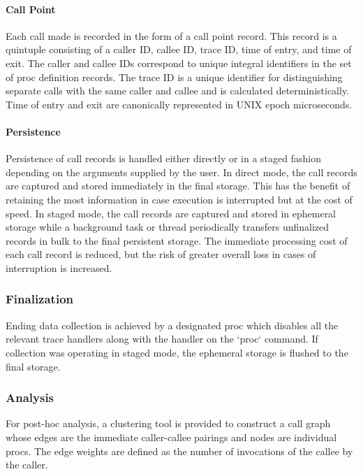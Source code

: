 \documentclass{article}[letter,10pt]
\begin{document}
{{    \paragraph{Call Point}{
      Each call made is recorded in the form of a call point record. This record
      is a quintuple consisting of a caller ID, callee ID, trace ID, time of
      entry, and time of exit. The caller and callee IDs correspond to unique
      integral identifiers in the set of proc definition records. The trace ID is a
      unique identifier for distinguishing separate calls with the same caller
      and callee and is calculated deterministically. Time of entry and exit are
      canonically represented in UNIX epoch microseconds.
    }
    \paragraph{Persistence}{
      Persistence of call records is handled either directly or in a staged fashion
      depending on the arguments supplied by the user. In direct mode, the call
      records are captured and stored immediately in the final storage. This has
      the benefit of retaining the most information in case execution is interrupted
      but at the cost of speed. In staged mode, the call records are captured and
      stored in ephemeral storage while a background task or thread periodically
      transfers unfinalized records in bulk to the final persistent storage. The
      immediate processing cost of each call record is reduced, but the risk of
      greater overall loss in cases of interruption is increased.
    }
  }
  \subsubsection{Finalization}{
    Ending data collection is achieved by a designated proc which disables
    all the relevant trace handlers along with the handler on the `proc` command.
    If collection was operating in staged mode, the ephemeral storage is flushed
    to the final storage.
  }
  \subsubsection{Analysis}{
    For post-hoc analysis, a clustering tool is provided to construct a call graph
    whose edges are the immediate caller-callee pairings and nodes are individual
    procs. The edge weights are defined as the number of invocations of the callee
    by the caller.

}}
\end{document}
